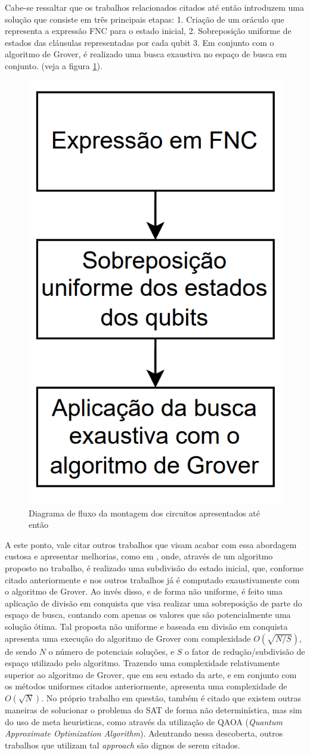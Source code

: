 \documentclass[12pt]{article}
\begin{document}
Cabe-se ressaltar que os trabalhos relacionados citados até então introduzem uma solução que consiste em três principais etapas: 1. Criação de um oráculo que representa a expressão FNC para o estado inicial, 2. Sobreposição uniforme de estados das cláusulas representadas por cada qubit 3. Em conjunto com o algoritmo de Grover, é realizado uma busca exaustiva no espaço de busca em conjunto. (veja a figura \ref{fig:diagrama_fluxo_trabalhos_relacionados}). 

\begin{figure}[h]
    \centering
    \includegraphics[width=0.18\linewidth]{diagrama_fluxo_convencional_trabalhos_relacionados.png}
        \caption{Diagrama de fluxo da montagem dos circuitos apresentados até então}
        \label{fig:diagrama_fluxo_trabalhos_relacionados}
\end{figure}
A este ponto, vale citar outros trabalhos que visam acabar com essa abordagem custosa e apresentar melhorias, como em \textbf{\cite{varmantchaonala:23}}, onde, através de um algoritmo proposto no trabalho, é realizado uma subdivisão do estado inicial, que, conforme citado anteriormente e nos outros trabalhos já é computado exaustivamente com o algoritmo de Grover. Ao invés disso, e de forma não uniforme, é feito uma aplicação de divisão em conquista que visa realizar uma sobreposição de parte do espaço de busca, contando com apenas os valores que são potencialmente uma solução ótima. Tal proposta não uniforme e baseada em divisão em conquista apresenta uma execução do algoritmo de Grover com complexidade
$O \left( \sqrt{{N/S}} \right)$, de sendo $N$ o número de potenciais soluções, e $S$ o fator de redução/subdivisão de espaço utilizado pelo algoritmo. Trazendo uma complexidade relativamente superior ao algoritmo de Grover, que em seu estado da arte, e em conjunto com os métodos uniformes citados anteriormente, apresenta uma complexidade de $O \left( \sqrt{N} \right)$. No próprio trabalho em questão, também é citado que existem outras maneiras de solucionar o problema do SAT de forma não determinística, mas sim do uso de meta heuristicas, como através da utilização de QAOA (\textit{Quantum Approximate Optimization Algorithm}). Adentrando nessa descoberta, outros trabalhos que utilizam tal \textit{approach} são dignos de serem citados.
\end{document}
